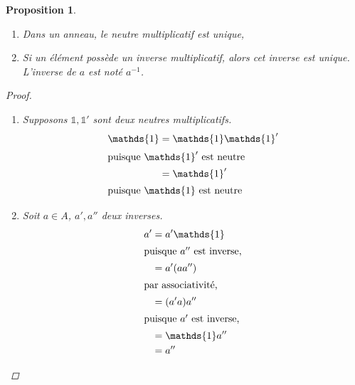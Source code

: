 \documentclass{report}
\newtheorem*{prop}{Proposition}
\theoremstyle{definition}
\theoremstyle{remark}
\def\id{\mathds{1}}
\begin{document}
	\begin{prop}
		\begin{enumerate}
			\item Dans un anneau, le neutre multiplicatif est unique,
			\item Si un \'el\'ement poss\`ede un inverse multiplicatif, alors cet inverse est unique. L'inverse de $a$ est not\'e $a^{-1}$.
		\end{enumerate}
		\begin{proof}
			\begin{enumerate}
				\item Supposons $\id,\id'$ sont deux neutres multiplicatifs.
				\begin{align*}
					\id&= \id\id'\\
					\shortintertext{puisque $\id'$ est neutre}
					&= \id'\\
					\shortintertext{puisque $\id$ est neutre}
				\end{align*}
				\item Soit $a \in A$, $a',a''$ deux inverses.
				\begin{align*}
					a'&= a'\id\\
					\shortintertext{puisque $a''$ est inverse,}
					&= a'(aa'')\\
					\shortintertext{par associativit\'e,}
					&= (a'a)a''\\
					\shortintertext{puisque $a'$ est inverse,}
					&= \id a''\\
					&= a''
				\end{align*}
			\end{enumerate}
		\end{proof}
	\end{prop}
\end{document}
